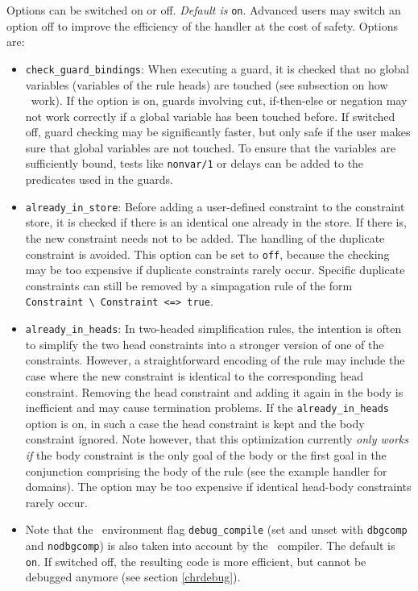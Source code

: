 Options can be switched on or off. {\em Default is} {\tt on}.
Advanced users may switch an option off to improve the efficiency
of the handler at the cost of safety. Options are:

\begin{itemize}
\item \verb/check_guard_bindings/:
When executing a guard, it is checked that no global variables
(variables of the rule heads) are touched (see subsection on how
\chrs\ work). If the option is on, guards involving cut, if-then-else
or negation may not work correctly if a global variable has been touched before.
If switched off, guard checking may be significantly
faster, but only safe if the user makes sure that global variables are
not touched. To ensure that the variables are sufficiently bound,
tests like {\tt nonvar/1} or delays can be added to the predicates
used in the guards.

\item \verb/already_in_store/: 
Before adding a user-defined constraint to the constraint store, it is
checked if there is an identical one already in the store. If there
is, the new constraint needs not to be added. The handling of the
duplicate constraint is avoided. This option can be set to \verb/off/,
because the checking may be too expensive if duplicate constraints
rarely occur.  Specific duplicate constraints can still be removed by
a simpagation rule of the form \verb/Constraint \ Constraint <=> true/.

\item \verb/already_in_heads/: 
In two-headed simplification rules, the intention is often to simplify
the two head constraints into a stronger version of one of the
constraints.  However, a straightforward encoding of the rule may
include the case where the new constraint is identical to the
corresponding head constraint.  Removing the head constraint and
adding it again in the body is inefficient and may cause termination
problems. If the \verb/already_in_heads/ option is on, in such a case
the head constraint is kept and the body constraint ignored. Note
however, that this optimization currently {\em only works if} the body
constraint is the only goal of the body or the first goal in the
conjunction comprising the body of the rule (see the example handler
for domains). The option may be too expensive if identical head-body
constraints rarely occur.

\item Note that the \eclipse\ environment flag \verb/debug_compile/ (set and
unset with \verb/dbgcomp/ and \verb/nodbgcomp/) is also taken into
account by the \chr\ compiler. The default is {\tt on}.
If switched off, the resulting code is more
efficient, but cannot be debugged anymore (see section \ref{chrdebug}).

\end{itemize}


